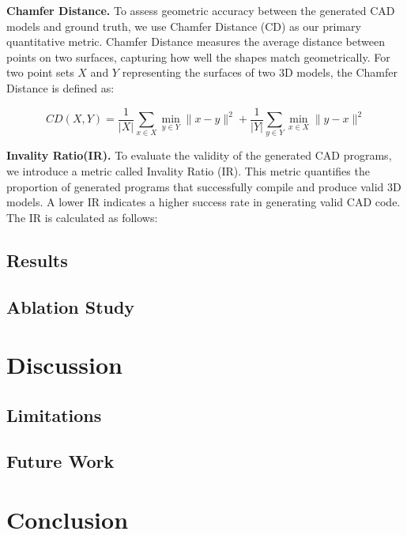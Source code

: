 \documentclass[letterpaper]{article} %
\begin{document}
\textbf{Chamfer Distance.} To assess geometric accuracy between the generated CAD models and ground truth, we use Chamfer Distance (CD) as our primary quantitative metric. Chamfer Distance measures the average distance between points on two surfaces, capturing how well the shapes match geometrically. For two point sets $X$ and $Y$ representing the surfaces of two 3D models, the Chamfer Distance is defined as:

$$CD(X, Y) = \frac{1}{|X|} \sum_{x \in X} \min_{y \in Y} \|x - y\|^2 + \frac{1}{|Y|} \sum_{y \in Y} \min_{x \in X} \|y - x\|^2$$

\textbf{Invality Ratio(IR).} To evaluate the validity of the generated CAD programs, we introduce a metric called Invality Ratio (IR). This metric quantifies the proportion of generated programs that successfully compile and produce valid 3D models. A lower IR indicates a higher success rate in generating valid CAD code. The IR is calculated as follows:


\subsection{Results}

\subsection{Ablation Study}


\section{Discussion}

\subsection{Limitations}

\subsection{Future Work}

\section{Conclusion}




\end{document}
